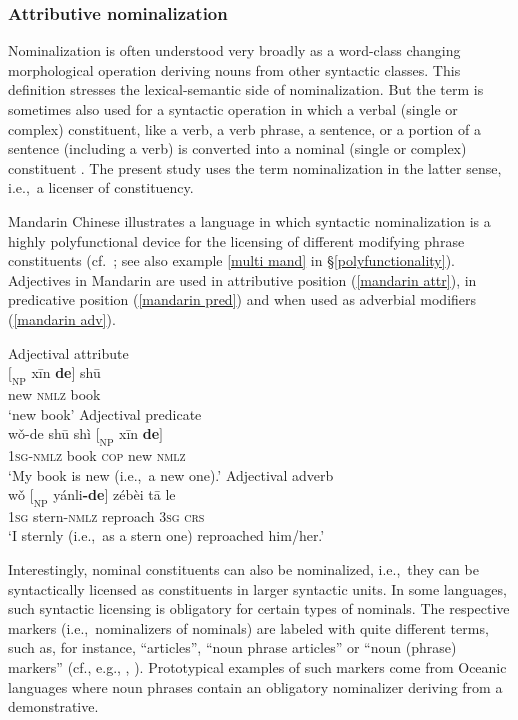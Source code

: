 \subsubsection{Attributive nominalization} \label{attr nmlz}
Nominalization is often understood very broadly as a word-class changing morphological operation deriving nouns from other syntactic classes. This definition stresses the lexical-semantic side of nominalization. But the term is sometimes also used for a syntactic operation in which a verbal (single or complex) constituent, like a verb, a verb phrase, a sentence, or a portion of a sentence (including a verb) is converted into a nominal (single or complex) constituent \citep[575]{li-etal1981}. The present study uses the term nominalization in the latter sense, i.e.,~a licenser of constituency.

Mandarin Chinese illustrates a language in which syntactic nominalization is a highly polyfunctional device for the licensing of different modifying phrase constituents (cf.~\citealt[575–593]{li-etal1981}; see also example \ref{multi mand} in \S\ref{polyfunctionality}). Adjectives in Mandarin are used in attributive position (\ref{mandarin attr}), in predicative position (\ref{mandarin pred}) and when used as adverbial modifiers (\ref{mandarin adv}).%
\begin{exe}
\ex
{}
\begin{xlist}
\ex	\rm{Adjectival attribute}\\
\gll	$[_\textrm{NP}$ xīn 		\textbf{de}$]$ 	shū\\
	{} new	 	\textsc{nmlz} 	book\\
\glt	‘new book’\label{mandarin attr}
\ex	\rm{Adjectival predicate}\\
\gll	wǒ-de shū shì $[_\textrm{NP}$ xīn \textbf{de}$]$\\
	\textsc{1sg-nmlz} book \textsc{cop} {} new \textsc{nmlz}\\
\glt	‘My book is new (i.e.,~a new one).’\label{mandarin pred}
\ex	\rm{Adjectival adverb}\\
\gll	wǒ $[_\textrm{NP}$ yánli\textbf{-de}$]$ zébèi tā le\\
	\textsc{1sg} {} stern\textsc{-nmlz} reproach \textsc{3sg} \textsc{crs}\\
\glt	‘I sternly (i.e.,~as a stern one) reproached him/her.’ \label{mandarin adv}
\end{xlist}
\end{exe}
Interestingly, nominal constituents can also be nominalized, i.e.,~they can be syntactically licensed as constituents in larger syntactic units. In some languages, such syntactic licensing is obligatory for certain types of nominals. The respective markers (i.e.,~nominalizers of nominals) are labeled with quite different terms, such as, for instance, “articles”, “noun phrase articles” or “noun (phrase) markers” (cf., e.g., \citealt[152]{dryer2007}, \citealt[95, passim]{rijkhoff2002}). Prototypical examples of such markers come from Oceanic languages where noun phrases contain an obligatory nominalizer deriving from a demonstrative. 


